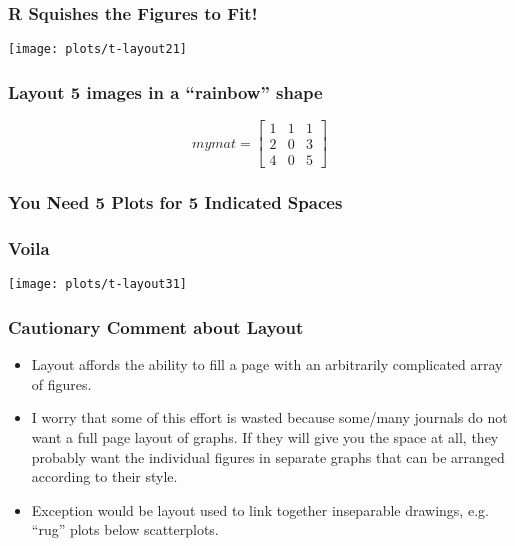\documentclass[11pt,english]{beamer}
\begin{document}

\begin{frame}[containsverbatim]
  \frametitle{R Squishes the Figures to Fit!}

\texttt{[image: plots/t-layout21]}
\end{frame}

\begin{frame}
  \frametitle{Layout 5 images in a ``rainbow'' shape}

  \begin{equation}
    mymat=\left[\begin{array}{ccc}
        1 & 1 & 1\\
        2 & 0 & 3\\
        4 & 0 & 5\end{array}\right]\end{equation}




\end{frame}


\begin{frame}[containsverbatim]
  \frametitle{You Need 5 Plots for 5 Indicated Spaces}




\end{frame}


\begin{frame}[containsverbatim]
  \frametitle{Voila}
  \texttt{[image: plots/t-layout31]}

\end{frame}


\begin{frame}
  \frametitle{Cautionary Comment about Layout}
  \begin{itemize}
    \item Layout affords the ability to fill a page with an
      arbitrarily complicated array of figures.
    \item I worry that some of this effort is wasted because some/many
      journals do not want a full page layout of graphs. If they will
      give you the space at all, they probably want the individual
      figures in separate graphs that can be arranged according to
      their style.
    \item Exception would be layout used to link together inseparable
      drawings, e.g. ``rug'' plots below scatterplots.
  \end{itemize}
\end{frame}
\end{document}
